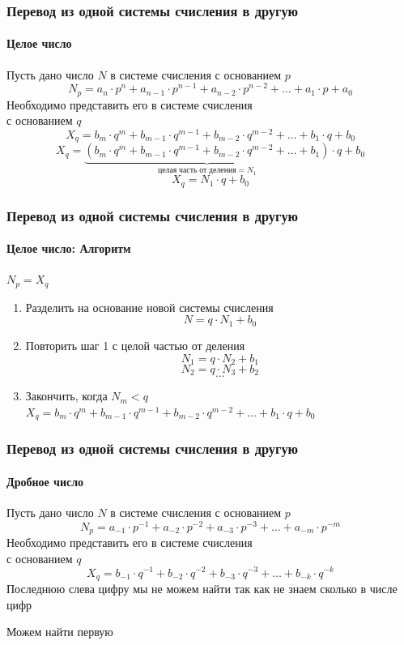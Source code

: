 \begin{frame}
  \frametitle{Перевод из одной системы счисления в другую}
	\framesubtitle{Целое число}
	Пусть дано число $N$ в системе счисления с основанием $p$
	$$
	N_p=a_{n}\cdot p^{n}+a_{n-1}\cdot p^{n-1}+a_{n-2}\cdot p^{n-2}+\ldots + a_{1}\cdot p+a_0
	$$	
	Необходимо представить его в системе счисления\\ с основанием $q$
	$$
	X_q=b_{m}\cdot q^{m}+b_{m-1}\cdot q^{m-1}+b_{m-2}\cdot q^{m-2}+\ldots + b_{1}\cdot q+b_0
	$$	
	\pause
	$$
	X_q=\underbrace{(b_{m}\cdot q^{m}+b_{m-1}\cdot q^{m-1}+b_{m-2}\cdot q^{m-2}+\ldots + b_{1})}_{целая\; часть \;от\; деления=N_1}\cdot q+b_0
	$$	
	\pause
	$$
	X_q=N_1\cdot q+b_0
	$$
	
	
	
\end{frame}

\begin{frame}
  \frametitle{Перевод из одной системы счисления в другую}
	\framesubtitle{Целое число: Алгоритм}
	$N_p=X_q$
	\begin{enumerate}
		\item Разделить на основание новой системы счисления
		$$ N=q\cdot N_1+b_0 $$
		\item Повторить шаг 1 с целой частью от деления
		$$ N_1=q\cdot N_2+b_1 $$
		$$ N_2=q\cdot N_3+b_2 $$
		$$ \ldots $$
		\item Закончить, когда $N_m < q $
		$X_q=b_{m}\cdot q^{m}+b_{m-1}\cdot q^{m-1}+b_{m-2}\cdot q^{m-2}+\ldots + b_{1}\cdot q+b_0$
	\end{enumerate}
	
	
\end{frame}

\begin{frame}
  \frametitle{Перевод из одной системы счисления в другую}
	\framesubtitle{Дробное число}
	Пусть дано число $N$ в системе счисления с основанием $p$
	$$
	N_p=a_{-1}\cdot p^{-1}+a_{-2}\cdot p^{-2}+a_{-3}\cdot p^{-3}+\ldots + a_{-m}\cdot p^{-m}
	$$	
	Необходимо представить его в системе счисления \\ с основанием $q$
	$$
	X_q=b_{-1}\cdot q^{-1}+b_{-2}\cdot q^{-2}+b_{-3}\cdot q^{-3}+\ldots + b_{-k}\cdot q^{-k}
	$$	
	\pause
	Последнюю слева цифру мы не можем найти так как не знаем сколько в числе цифр
	
	\pause
	Можем найти первую
	
	
\end{frame}

